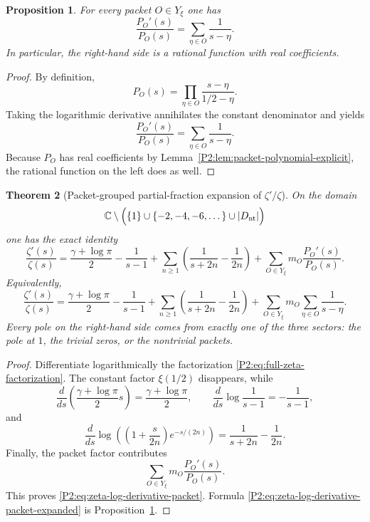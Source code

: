 \documentclass[11pt,a4paper]{article}
\numberwithin{equation}{section}
\newtheorem{theorem}{Theorem}[section]
\newtheorem{proposition}[theorem]{Proposition}
\theoremstyle{definition}
\theoremstyle{remark}
\newcommand{\CC}{\mathbb C}
\begin{document}
\begin{proposition}\label{P2:prop:packet-log-derivative}
For every packet $O\in Y_\xi$ one has
\begin{equation}\label{P2:eq:packet-log-derivative}
\frac{P_O'(s)}{P_O(s)}=\sum_{\eta\in O}\frac{1}{s-\eta}.
\end{equation}
In particular, the right-hand side is a rational function with real coefficients.
\end{proposition}

\begin{proof}
By definition,
\[
P_O(s)=\prod_{\eta\in O}\frac{s-\eta}{1/2-\eta}.
\]
Taking the logarithmic derivative annihilates the constant denominator and yields
\[
\frac{P_O'(s)}{P_O(s)}=\sum_{\eta\in O}\frac{1}{s-\eta}.
\]
Because $P_O$ has real coefficients by Lemma~\ref{P2:lem:packet-polynomial-explicit}, the rational function on the left does as well.
\end{proof}

\begin{theorem}[Packet-grouped partial-fraction expansion of $\zeta'/\zeta$]\label{P2:thm:zeta-log-derivative-packet}
On the domain
\[
\CC\setminus\Bigl(\{1\}\cup\{-2,-4,-6,\dots\}\cup |D_{\mathrm{nt}}|\Bigr)
\]
one has the exact identity
\begin{equation}\label{P2:eq:zeta-log-derivative-packet}
\frac{\zeta'(s)}{\zeta(s)}
=
\frac{\gamma+\log\pi}{2}
-\frac{1}{s-1}
+\sum_{n\ge 1}\left(\frac{1}{s+2n}-\frac{1}{2n}\right)
+\sum_{O\in Y_\xi} m_O\frac{P_O'(s)}{P_O(s)}.
\end{equation}
Equivalently,
\begin{equation}\label{P2:eq:zeta-log-derivative-packet-expanded}
\frac{\zeta'(s)}{\zeta(s)}
=
\frac{\gamma+\log\pi}{2}
-\frac{1}{s-1}
+\sum_{n\ge 1}\left(\frac{1}{s+2n}-\frac{1}{2n}\right)
+\sum_{O\in Y_\xi} m_O\sum_{\eta\in O}\frac{1}{s-\eta}.
\end{equation}
Every pole on the right-hand side comes from exactly one of the three sectors: the pole at $1$, the trivial zeros, or the nontrivial packets.
\end{theorem}

\begin{proof}
Differentiate logarithmically the factorization \eqref{P2:eq:full-zeta-factorization}.  The constant factor $\xi(1/2)$ disappears, while
\[
\frac{d}{ds}\left(\frac{\gamma+\log\pi}{2}s\right)=\frac{\gamma+\log\pi}{2},
\qquad
\frac{d}{ds}\log\frac{1}{s-1}=-\frac{1}{s-1},
\]
and
\[
\frac{d}{ds}\log\left(\left(1+\frac{s}{2n}\right)e^{-s/(2n)}\right)
=\frac{1}{s+2n}-\frac{1}{2n}.
\]
Finally, the packet factor contributes
\[
\sum_{O\in Y_\xi} m_O\frac{P_O'(s)}{P_O(s)}.
\]
This proves \eqref{P2:eq:zeta-log-derivative-packet}.  Formula \eqref{P2:eq:zeta-log-derivative-packet-expanded} is Proposition~\ref{P2:prop:packet-log-derivative}.
\end{proof}
\end{document}
